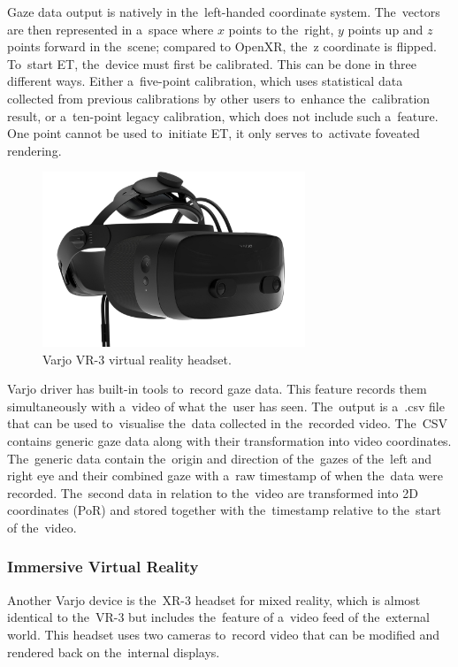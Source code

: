 Gaze data output is natively in the~left-handed coordinate system. The~vectors are then represented in a~space where $x$ points to the~right, $y$ points up and $z$ points forward in the~scene; compared to OpenXR, the~z coordinate is flipped. To~start ET, the~device must first be calibrated. This can be done in three different ways. Either a~five-point calibration, which uses statistical data collected from previous calibrations by other users to~enhance the~calibration result, or a~ten-point legacy calibration, which does not include such a~feature. One point cannot be used to~initiate ET, it only serves to~activate foveated rendering.~\cite{varjo-sdk-spec}

\begin{figure}[!t]\centering
    \includegraphics[width=0.7\textwidth]{img/Varjo-VR3.jpg}
    \caption[Varjo VR-3 virtual veality headset.]{Varjo VR-3 virtual reality headset.~\cite{varjo-vr3-image}}
    \label{fig:varjo-vr3}
\end{figure}

Varjo driver has built-in tools to~record gaze data. This feature records them simultaneously with a~video of what the~user has seen. The~output is a~.csv file that can be used to~visualise the~data collected in the~recorded video. The~CSV contains generic gaze data along with their transformation into video coordinates. The~generic data contain the~origin and direction of the~gazes of the~left and right eye and their combined gaze with a~raw timestamp of when the~data were recorded. The~second data in relation to the~video are transformed into 2D coordinates (PoR) and stored together with the~timestamp relative to the~start of the~video.~\cite{varjo-data-logging}


\subsubsection*{Immersive Virtual Reality}
Another Varjo device is the~XR-3 headset for mixed reality, which is almost identical to the~VR-3 but includes the~feature of a~video feed of the~external world. This headset uses two cameras to~record video that can be modified and rendered back on the~internal displays.~\cite{varjo-xr3}

